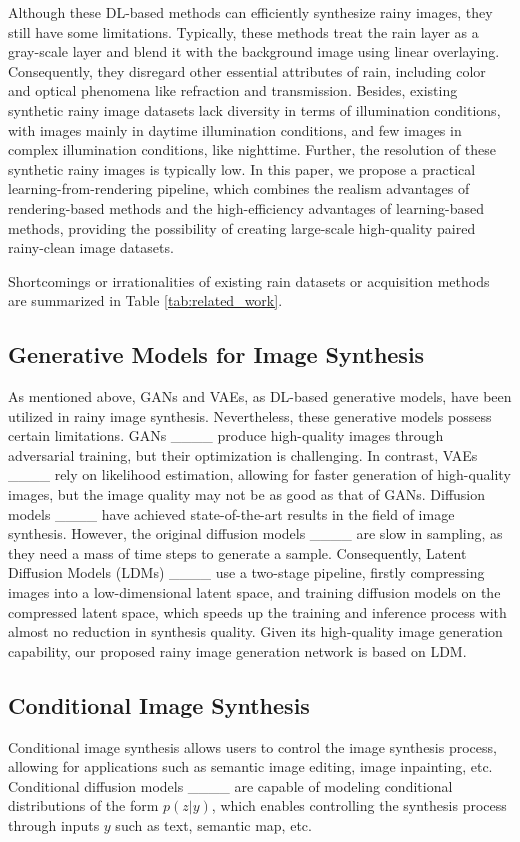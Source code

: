 Although these DL-based methods can efficiently synthesize rainy images, they still have some limitations. Typically, these methods treat the rain layer as a gray-scale layer and blend it with the background image using linear overlaying. Consequently, they disregard other essential attributes of rain, including color and optical phenomena like refraction and transmission. Besides, existing synthetic rainy image datasets lack diversity in terms of illumination conditions, with images mainly in daytime illumination conditions, and few images in complex illumination conditions, like nighttime. Further, the resolution of these synthetic rainy images is typically low. In this paper, we propose a practical learning-from-rendering pipeline, which combines the realism advantages of rendering-based methods and the high-efficiency advantages of learning-based methods, providing the possibility of creating large-scale high-quality paired rainy-clean image datasets.

Shortcomings or irrationalities of existing rain datasets or acquisition methods are summarized in Table \ref{tab:related_work}.

\subsection{Generative Models for Image Synthesis}

As mentioned above, GANs and VAEs, as DL-based generative models, have been utilized in rainy image synthesis. Nevertheless, these generative models possess certain limitations. GANs ____ produce high-quality images through adversarial training, but their optimization is challenging. In contrast, VAEs ____ rely on likelihood estimation, allowing for faster generation of high-quality images, but the image quality may not be as good as that of GANs. Diffusion models ____ have achieved state-of-the-art results in the field of image synthesis. However, the original diffusion models ____ are slow in sampling, as they need a mass of time steps to generate a sample. Consequently, Latent Diffusion Models (LDMs) ____ use a two-stage pipeline, firstly compressing images into a low-dimensional latent space, and  training diffusion models on the compressed latent space, which speeds up the training and inference process with almost no reduction in synthesis quality. Given its high-quality image generation capability, our proposed rainy image generation network is based on LDM.

\subsection{Conditional Image Synthesis}
Conditional image synthesis allows users to control the image synthesis process, allowing for applications such as semantic image editing, image inpainting, etc. Conditional diffusion models ____ are capable of modeling conditional distributions of the form $p(z|y)$, which enables controlling the synthesis process through inputs $y$ such as text, semantic map, etc. 

